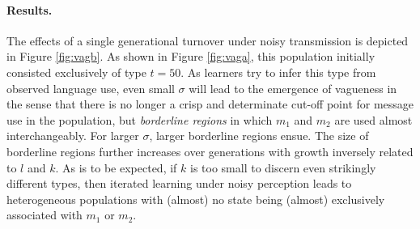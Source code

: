 \documentclass[10pt,a4paper]{article}
\begin{document}
\paragraph{Results.} The effects of a single generational turnover under noisy transmission is
depicted in Figure \ref{fig:vagb}. As shown in Figure \ref{fig:vaga}, this population initially
consisted exclusively of type $t = 50$.  As
learners try to infer this type from observed language use, even small $\sigma$ will lead to
the emergence of vagueness in the sense that there is no longer a crisp and determinate cut-off
point for message use in the population, but \emph{borderline regions} in which $m_1$ and $m_2$
are used almost interchangeably. For larger $\sigma$, larger borderline regions ensue. The size
of borderline regions further increases over generations with growth inversely related to $l$
and $k$. As is to be expected, if $k$ is too small to discern even strikingly different types,
then iterated learning under noisy perception leads to heterogeneous populations with (almost)
no state being (almost) exclusively associated with $m_1$ or $m_2$.
\end{document}
